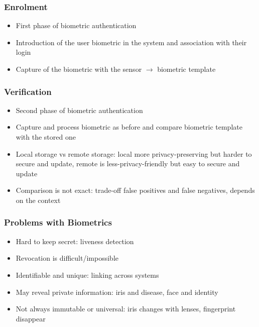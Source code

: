 \documentclass{article}
\newenvironment{myitemize}
{ \begin{itemize}
    \setlength{\itemsep}{005pt}
    \setlength{\parskip}{0pt}
    \setlength{\parsep}{0pt}     }
{ \end{itemize}                  }
\begin{document}
\begin{multicols}{2}
\subsubsection{Enrolment}

\begin{myitemize}
     \item First phase of biometric authentication
     \item Introduction of the user biometric in the system and association with their login
     \item Capture of the biometric with the sensor $\rightarrow$ biometric template
\end{myitemize}

\subsubsection{Verification}

\begin{myitemize}
    \item Second phase of biometric authentication
    \item Capture and process biometric as before and compare biometric template with the stored one
    \item Local storage vs remote storage: local more privacy-preserving but harder to secure and update, remote is less-privacy-friendly but easy to secure and update
    \item Comparison is not exact: trade-off false positives and false negatives, depends on the context
\end{myitemize}

\subsubsection{Problems with Biometrics}

\begin{myitemize}
    \item Hard to keep secret: liveness detection
    \item Revocation is difficult/impossible
    \item Identifiable and unique: linking across systems
    \item May reveal private information: iris and disease, face and identity
    \item Not always immutable or universal: iris changes with lenses, fingerprint disappear
\end{myitemize}



\end{multicols}
\end{document}
